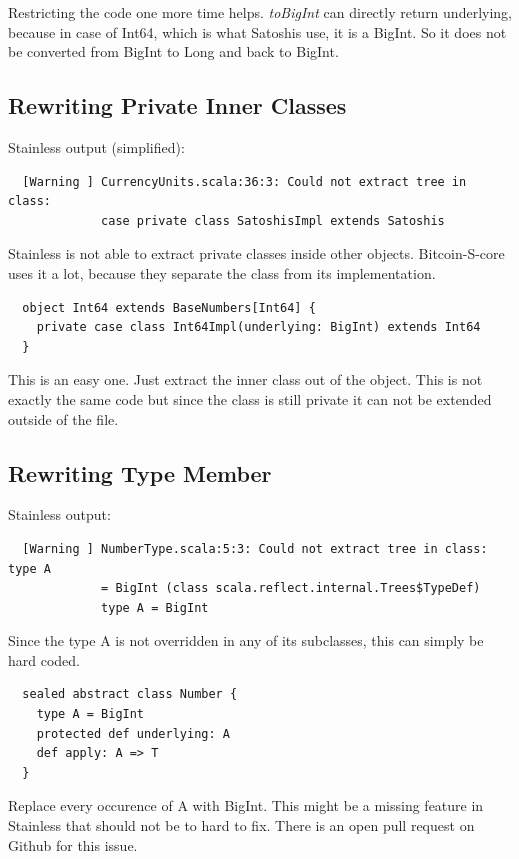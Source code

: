 Restricting the code one more time helps.
\emph{toBigInt} can directly return underlying, because in case of Int64, which is what Satoshis use, it is a BigInt.
So it does not be converted from BigInt to Long and back to BigInt.

\subsection{Rewriting Private Inner Classes}
Stainless output (simplified):
\begin{lstlisting}
  [Warning ] CurrencyUnits.scala:36:3: Could not extract tree in class:
             case private class SatoshisImpl extends Satoshis
\end{lstlisting}
Stainless is not able to extract private classes inside other objects.
Bitcoin-S-core uses it a lot, because they separate the class from its implementation.
\begin{lstlisting}
  object Int64 extends BaseNumbers[Int64] {
    private case class Int64Impl(underlying: BigInt) extends Int64 
  }
\end{lstlisting}
This is an easy one.
Just extract the inner class out of the object.
This is not exactly the same code but since the class is still private it can not be extended outside of the file.

\subsection{Rewriting Type Member}
Stainless output:
\begin{lstlisting}
  [Warning ] NumberType.scala:5:3: Could not extract tree in class: type A
             = BigInt (class scala.reflect.internal.Trees$TypeDef)
             type A = BigInt
\end{lstlisting}
Since the type A is not overridden in any of its subclasses, this can simply be hard coded.
\begin{lstlisting}
  sealed abstract class Number {
    type A = BigInt
    protected def underlying: A
    def apply: A => T
  }
\end{lstlisting}
Replace every occurence of A with BigInt.
This might be a missing feature in Stainless that should not be to hard to fix.
There is an open pull request  on Github for this issue.

